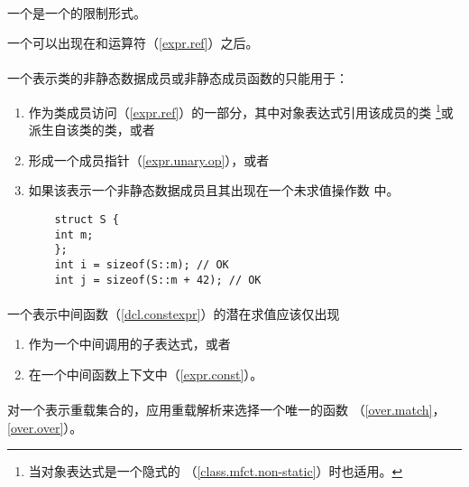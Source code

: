 
\paragraph{} %
一个是一个的限制形式。

\begin{note}
  一个可以出现在和\tm{->}运算符（\ref{expr.ref}）之后。
\end{note}

\paragraph{} %
一个表示类的非静态数据成员或非静态成员函数的只能用于：
\begin{enumerate}
  \item 作为类成员访问（\ref{expr.ref}）的一部分，其中对象表达式引用该成员的类
        \footnote{当对象表达式是一个隐式的
        （\ref{class.mfct.non-static}）时也适用。}或派生自该类的类，或者
  \item 形成一个成员指针（\ref{expr.unary.op}），或者
  \item 如果该表示一个非静态数据成员且其出现在一个未求值操作数
        中。

\begin{example}
  \begin{lstlisting}
    struct S {
    int m;
    };
    int i = sizeof(S::m); // OK
    int j = sizeof(S::m + 42); // OK
  \end{lstlisting}
\end{example}
\end{enumerate}

\paragraph{} %
一个表示中间函数（\ref{dcl.constexpr}）的潜在求值应该仅出现
\begin{enumerate}
  \item 作为一个中间调用的子表达式，或者
  \item 在一个中间函数上下文中（\ref{expr.const}）。
\end{enumerate}

\paragraph{} %
对一个表示重载集合的，应用重载解析来选择一个唯一的函数
（\ref{over.match}，\ref{over.over}）。

